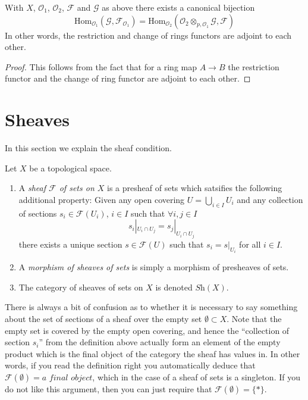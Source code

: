 \begin{lemma}
\label{lemma-adjointness-tensor-restrict-presheaves}
With $X$, $\mathcal{O}_1$, $\mathcal{O}_2$, $\mathcal{F}$ and
$\mathcal{G}$ as above there exists a canonical bijection
$$
\text{Hom}_{\mathcal{O}_1}(\mathcal{G}, \mathcal{F}_{\mathcal{O}_1})
=
\text{Hom}_{\mathcal{O}_2}(
\mathcal{O}_2 \otimes_{p, \mathcal{O}_1} \mathcal{G},
\mathcal{F}
)
$$
In other words, the restriction and change of rings functors
are adjoint to each other.
\end{lemma}

\begin{proof}
This follows from the fact that for a ring map
$A \to B$ the restriction functor and the change
of ring functor are adjoint to each other.
\end{proof}





\section{Sheaves}
\label{section-sheaves}

\noindent
In this section we explain the sheaf condition.

\begin{definition}
\label{definition-sheaf}
Let $X$ be a topological space.
\begin{enumerate}
\item A {\it sheaf $\mathcal{F}$ of sets on $X$} is a presheaf
of sets which satsifies the following additional property: Given
any open covering $U = \bigcup_{i \in I} U_i$ and any collection
of sections $s_i \in \mathcal{F}(U_i)$, $i \in I$ such that
$\forall i,j\in I$
$$
s_i|_{U_i \cap U_j} = s_j|_{U_i \cap U_j}
$$
there exists a unique section $s \in \mathcal{F}(U)$ such that
$s_i = s|_{U_i}$ for all $i \in I$.
\item A {\it morphism of sheaves of sets} is simply a
morphism of presheaves of sets.
\item The category of sheaves of sets on $X$ is denoted
$\textit{Sh}(X)$.
\end{enumerate}
\end{definition}

\begin{remark}
There is always a bit of confusion as to whether it is
necessary to say something about the set of sections of
a sheaf over the empty set $\emptyset \subset X$.
Note that the empty set is
covered by the empty open covering, and hence the ``collection
of section $s_i$'' from the definition above actually form
an element of the empty product which is the final object
of the category the sheaf has values in. In other words,
if you read the definition right you automatically deduce
that $\mathcal{F}(\emptyset) = \textit{a final object}$,
which in the case of a sheaf of sets is a singleton.
If you do not like this argument, then you can just require
that $\mathcal{F}(\emptyset) = \{*\}$.
\end{remark}

